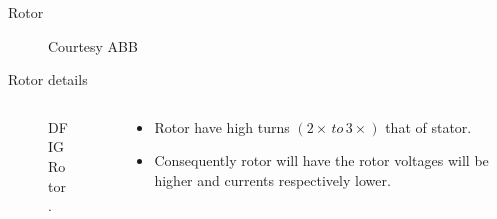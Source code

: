 \documentclass{beamer}
\begin{document}
\begin{frame}{Rotor}

    \begin{figure}
        \centering
        \caption{Courtesy ABB}
    \end{figure}    
\end{frame}


\begin{frame}{Rotor details}
  
  \begin{columns}
  
        \begin{column}{0.6\textwidth} %
    \begin{figure}
        \centering
        \caption{\small DFIG Rotor.}
    \end{figure}
    \end{column}
    
    \begin{column}{0.4\textwidth} 
        \begin{itemize}
            \item Rotor have high turns $(2\times\, to \,3\times)$ that of stator.

            \item Consequently rotor will have the rotor voltages will be higher and currents respectively lower. 
        \end{itemize}
    \end{column}

  \end{columns}
\end{frame}
\end{document}
